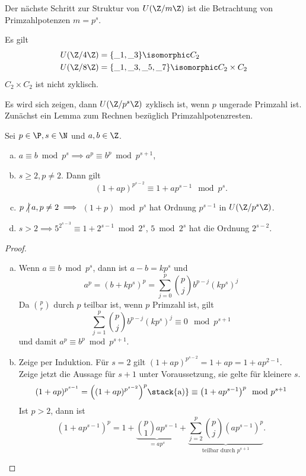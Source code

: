 Der nächste Schritt zur Struktur von $U(\Z / m \Z)$ ist die Betrachtung von Primzahlpotenzen $m = p^s$.

\begin{ex*}
	Es gilt
	\begin{align*}
		U(\Z / 4 \Z) &= \{ \_ 1, \_ 3 \} \isomorphic C_2 \\
		U(\Z / 8 \Z) &= \{ \_ 1, \_ 3, \_ 5, \_ 7 \} \isomorphic C_2 \times C_2
	\end{align*}
	$C_2 \times C_2$ ist nicht zyklisch.
\end{ex*}

Es wird sich zeigen, dann $U(\Z / p^s \Z)$ zyklisch ist, wenn $p$ ungerade Primzahl ist.
Zunächst ein Lemma zum Rechnen bezüglich Primzahlpotenzresten.

\begin{lem} \label{2.7}
	Sei $p \in \P, s \in \N$ und $a, b \in \Z$.
	\begin{enumerate}[a)]
		\item
			$a \equiv b \bmod p^s \implies a^p \equiv b^p \bmod p^{s+1}$,
		\item
			$s \ge 2, p\neq 2$.
			Dann gilt
			\[
				(1 + ap)^{p^{s-2}}
				\equiv 1 + ap^{s-1} \mod p^s.
			\]
		\item
			$p \ndivs a, p \neq 2 \implies $ $(1+p) \bmod p^s$ hat Ordnung $p^{s-1}$ in $U(\Z / p^s \Z)$.
		\item
			$s > 2 \implies 5^{2^{s-3}} \equiv 1 + 2^{s-1} \bmod 2^s$, $5 \bmod 2^s$ hat die Ordnung $2^{s-2}$.
	\end{enumerate}
	\begin{proof}
		\begin{enumerate}[a)]
			\item
				Wenn $a \equiv b \bmod p^s$, dann ist $a - b = k p^s$ und
				\[
					a^p
					= (b + kp^s)^p
					= \sum_{j=0}^p \binom{p}{j} b^{p-j} (kp^s)^j
				\]
				Da $\binom{p}{r}$ durch $p$ teilbar ist, wenn $p$ Primzahl ist, gilt
				\[
					\sum_{j=1}^p \binom{p}{j} b^{p-j} (kp^s)^j \equiv 0 \mod p^{s+1}
				\]
				und damit $a^p \equiv b^p \bmod p^{s+1}$.
			\item
{}
				Zeige per Induktion.
				Für $s = 2$ gilt $(1 + ap)^{p^{s-2}} = 1 + ap = 1 + ap^{2-1}$.
				Zeige jetzt die Aussage für $s + 1$ unter Voraussetzung, sie gelte für kleinere $s$.
				\[
					(1 + ap)^{p^{s-1}}
					= \Big((1 + ap)^{p^{s-2}}\Big)^p
					\stack{\text{a)}}\equiv \big(1 + ap^{s-1} \big)^p \mod p^{s+1}
				\]
				Ist $p > 2$, dann ist
				\[
					(1 + ap^{s-1})^p
					= 1 + \underbrace{\binom{p}{1} ap^{s-1}}_{= ap^s} +  \underbrace{\sum_{j=2}^p \binom{p}{j} (ap^{s-1})^p}_{\text{teilbar durch $p^{s+1}$}}.
\]
\end{enumerate}
\end{proof}
\end{lem}
